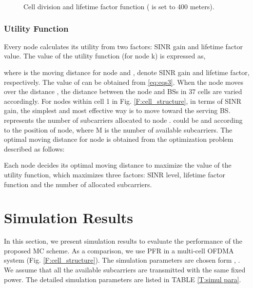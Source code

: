 \documentclass[conference]{IEEEtran}
\begin{document}
\begin{figure}[t]
\centering
{}
\label{F:lifetime}
\caption{Cell division and lifetime factor function ( is set to 400 meters).}
\end{figure}




\subsubsection{Utility Function}


Every node calculates its utility from two factors: SINR gain and lifetime factor value. The value of the utility function (for node k) is expressed as,




\noindent where  is the moving distance for node  and ,  denote SINR gain and lifetime factor, respectively. The value of  can be obtained from \eqref{eq:eqs3}. When the node moves over the distance , the distance between the node and BSs in 37 cells are varied accordingly. For nodes within cell 1 in Fig. \ref{F:cell_structure}, in terms of SINR gain, the simplest and most effective way is to move toward the serving BS.  represents the number of subcarriers allocated to node .  could be  and  according to the position of node, where M is the number of available subcarriers. The optimal moving distance  for node  is obtained from the optimization problem described as follows:

 

Each node decides its optimal moving distance to maximize the value of the utility function, which maximizes three factors: SINR level, lifetime factor function and the number of allocated subcarriers.


\section{Simulation Results}

 In this section, we present simulation results to evaluate the performance of the proposed MC scheme. As a comparison, we use PFR in a multi-cell OFDMA system (Fig. \ref{F:cell_structure}). The simulation parameters are chosen form \cite{Lei}, \cite{LTESPEC}. We assume that all the available subcarriers are transmitted with the same fixed power. The detailed simulation parameters are listed in TABLE \ref{T:simul para}.
\end{document}
